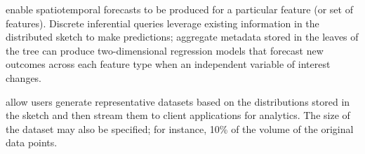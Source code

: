 \documentclass[9pt,journal,compsoc]{IEEEtran}
\begin{document}
\begin{description}[leftmargin=*]

\item[Inferential Queries] enable spatiotemporal forecasts to be produced for a particular feature (or set of features). Discrete inferential queries leverage existing information in the distributed sketch to make predictions; aggregate metadata stored in the leaves of the tree can produce two-dimensional regression models that forecast new outcomes across each feature type when an independent variable of interest changes.


\item[Synthetic Data Queries] allow users generate representative datasets based on the distributions stored in the sketch and then stream them to client applications for analytics. The size of the dataset may also be specified; for instance, 10\% of the volume of the original data points.
\end{description}
%
\end{document}
